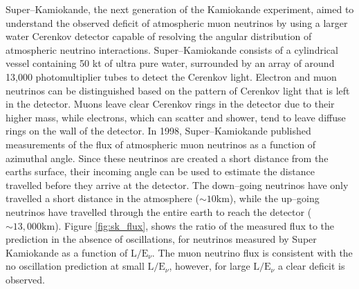 Super--Kamiokande, the next generation of the Kamiokande experiment, aimed to
understand the observed deficit of atmospheric muon neutrinos by using a larger 
water Cerenkov detector capable of resolving the angular distribution of 
atmospheric neutrino interactions. Super--Kamiokande consists of a cylindrical 
vessel containing 50 kt of ultra pure water, surrounded by an array of around 
13,000 photomultiplier tubes to detect the Cerenkov light. Electron and muon 
neutrinos can be distinguished based on the pattern of Cerenkov light that is 
left in the detector. Muons leave clear Cerenkov rings in the detector due to 
their higher mass, while electrons, which can scatter and shower, tend to leave 
diffuse  rings on the wall of the detector. In 1998, 
Super--Kamiokande published measurements of the flux of atmospheric muon 
neutrinos as a function of azimuthal angle\cite{Fukuda1998}. Since these 
neutrinos are created a short distance from the earths surface, their incoming 
angle can be used to estimate the distance travelled before they arrive at the 
detector. The down--going neutrinos have only travelled a short distance in 
the atmosphere (\(\sim 10 \mbox{km}\)), while the up--going neutrinos have 
travelled through the entire earth to reach the detector (\(\sim 13,000 
\mbox{km}\)). Figure \ref{fig:sk_flux}, shows the ratio of the measured flux 
to the prediction in the absence of oscillations, for neutrinos measured by 
Super Kamiokande as a function of \(\mbox{L} / \mbox{E}_\nu\). The muon 
neutrino flux is consistent with the no oscillation prediction at small 
\(\mbox{L} / \mbox{E}_\nu\), however, for large \(\mbox{L} / \mbox{E}_\nu\) a 
clear deficit is observed. 

